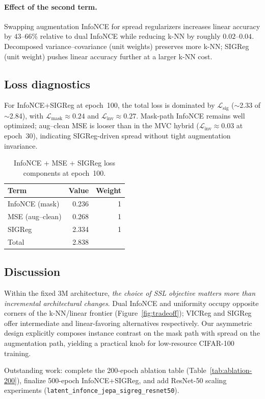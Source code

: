 \paragraph{Effect of the second term.}
Swapping augmentation InfoNCE for spread regularizers increases linear
accuracy by $43$--$66\%$ relative to dual InfoNCE while reducing k-NN by
roughly $0.02$--$0.04$.
Decomposed variance--covariance (unit weights) preserves more k-NN; SIGReg
(unit weight) pushes linear accuracy further at a larger k-NN cost.

\subsection{Loss diagnostics}
\label{sec:results-diagnostics}

For InfoNCE+SIGReg at epoch~100, the total loss is dominated by
$\mathcal{L}_{\mathrm{sig}}$ ($\sim$2.33 of $\sim$2.84), with
$\mathcal{L}_{\mathrm{mask}}\approx 0.24$ and $\mathcal{L}_{\mathrm{inv}}\approx 0.27$.
Mask-path InfoNCE remains well optimized; aug--clean MSE is looser than in
the MVC hybrid ($\mathcal{L}_{\mathrm{inv}}\approx 0.03$ at epoch~30),
indicating SIGReg-driven spread without tight augmentation invariance.

\begin{table}[t]
  \centering
  \caption{InfoNCE + MSE + SIGReg loss components at epoch~100.}
  \label{tab:loss}
  \begin{tabular}{lrr}
    \toprule
    Term & Value & Weight \\
    \midrule
    InfoNCE (mask) & 0.236 & 1 \\
    MSE (aug--clean) & 0.268 & 1 \\
    SIGReg & 2.334 & 1 \\
    \midrule
    Total & 2.838 & \\
    \bottomrule
  \end{tabular}
\end{table}

\subsection{Discussion}
\label{sec:discussion}

Within the fixed 3M architecture, \emph{the choice of SSL objective matters
more than incremental architectural changes}.
Dual InfoNCE and uniformity occupy opposite corners of the k-NN/linear
frontier (Figure~\ref{fig:tradeoff}); VICReg and SIGReg offer intermediate
and linear-favoring alternatives respectively.
Our asymmetric design explicitly composes instance contrast on the mask path
with spread on the augmentation path, yielding a practical knob for
low-resource CIFAR-100 training.

Outstanding work: complete the 200-epoch ablation table
(Table~\ref{tab:ablation-200}), finalize 500-epoch InfoNCE+SIGReg, and add
ResNet-50 scaling experiments (\texttt{latent\_infonce\_jepa\_sigreg\_resnet50}).
